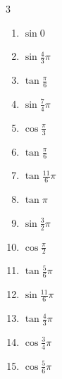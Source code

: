 \begin{multicols}{3}
\begin{enumerate}
\resetques

  \item $\displaystyle \sin{0}$
        \phantom{$\displaystyle =0$}

  \item $\displaystyle \sin{\frac{4}{3}\pi}$

  \item $\displaystyle \tan{\frac{\pi}{6}}$

  \item $\displaystyle \sin{\frac{7}{4}\pi}$

  \item $\displaystyle \cos{\frac{\pi}{3}}$

  \item $\displaystyle \tan{\frac{\pi}{6}}$

  \item $\displaystyle \tan{\frac{11}{6}\pi}$

  \item $\displaystyle \tan{\pi}$
        \phantom{$\displaystyle =0$}

  \item $\displaystyle \sin{\frac{3}{2}\pi}$
        \phantom{$\displaystyle =-1$}

  \item $\displaystyle \cos{\frac{\pi}{2}}$
        \phantom{$\displaystyle =0$}

  \item $\displaystyle \tan{\frac{5}{6}\pi}$

  \item $\displaystyle \sin{\frac{11}{6}\pi}$

  \item $\displaystyle \tan{\frac{4}{3}\pi}$

  \item $\displaystyle \cos{\frac{3}{4}\pi}$

  \item $\displaystyle \cos{\frac{5}{6}\pi}$


\end{enumerate}
\end{multicols}
